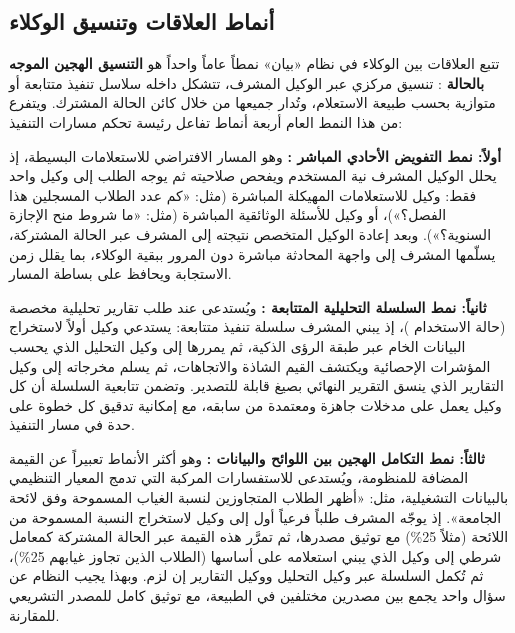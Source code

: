 \subsection{أنماط العلاقات وتنسيق الوكلاء}
\label{subsec:agent-orchestration-patterns}

تتبع العلاقات بين الوكلاء في نظام «بيان» نمطاً عاماً واحداً هو \textbf{التنسيق الهجين الموجه بالحالة }: تنسيق مركزي عبر الوكيل المشرف، تتشكل داخله سلاسل تنفيذ متتابعة أو متوازية بحسب طبيعة الاستعلام، وتُدار جميعها من خلال كائن الحالة المشترك. ويتفرع من هذا النمط العام أربعة أنماط تفاعل رئيسة تحكم مسارات التنفيذ:

\textbf{أولاً: نمط التفويض الأحادي المباشر :} وهو المسار الافتراضي للاستعلامات البسيطة، إذ يحلل الوكيل المشرف نية المستخدم ويفحص صلاحيته ثم يوجه الطلب إلى وكيل واحد فقط: وكيل  للاستعلامات المهيكلة المباشرة (مثل: «كم عدد الطلاب المسجلين هذا الفصل؟»)، أو وكيل  للأسئلة الوثائقية المباشرة (مثل: «ما شروط منح الإجازة السنوية؟»). وبعد إعادة الوكيل المتخصص نتيجته إلى المشرف عبر الحالة المشتركة، يسلّمها المشرف إلى واجهة المحادثة مباشرة دون المرور ببقية الوكلاء، بما يقلل زمن الاستجابة ويحافظ على بساطة المسار.

\textbf{ثانياً: نمط السلسلة التحليلية المتتابعة :} ويُستدعى عند طلب تقارير تحليلية مخصصة (حالة الاستخدام )، إذ يبني المشرف سلسلة تنفيذ متتابعة: يستدعي وكيل  أولاً لاستخراج البيانات الخام عبر طبقة الرؤى الذكية، ثم يمررها إلى وكيل التحليل الذي يحسب المؤشرات الإحصائية ويكتشف القيم الشاذة والاتجاهات، ثم يسلم مخرجاته إلى وكيل التقارير الذي ينسق التقرير النهائي بصيغ قابلة للتصدير. وتضمن تتابعية السلسلة أن كل وكيل يعمل على مدخلات جاهزة ومعتمدة من سابقه، مع إمكانية تدقيق كل خطوة على حدة في مسار التنفيذ.

\textbf{ثالثاً: نمط التكامل الهجين بين اللوائح والبيانات :} وهو أكثر الأنماط تعبيراً عن القيمة المضافة للمنظومة، ويُستدعى للاستفسارات المركبة التي تدمج المعيار التنظيمي بالبيانات التشغيلية، مثل: «أظهر الطلاب المتجاوزين لنسبة الغياب المسموحة وفق لائحة الجامعة». إذ يوجّه المشرف طلباً فرعياً أول إلى وكيل  لاستخراج النسبة المسموحة من اللائحة (مثلاً 25\%) مع توثيق مصدرها، ثم تمرَّر هذه القيمة عبر الحالة المشتركة كمعامل شرطي  إلى وكيل  الذي يبني استعلامه على أساسها (الطلاب الذين تجاوز غيابهم 25\%)، ثم تُكمل السلسلة عبر وكيل التحليل ووكيل التقارير إن لزم. وبهذا يجيب النظام عن سؤال واحد يجمع بين مصدرين مختلفين في الطبيعة، مع توثيق كامل للمصدر التشريعي للمقارنة.

